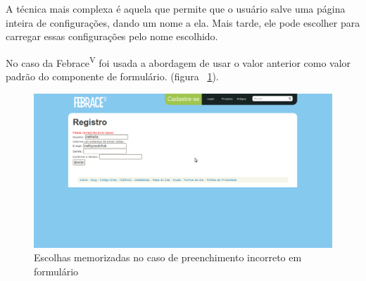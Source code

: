 A técnica mais complexa é aquela que permite que o usuário salve uma página inteira de configurações, dando um nome a ela. Mais tarde, ele pode escolher para carregar essas configurações pelo nome escolhido.

No caso da Febrace\textsuperscript{V} foi usada a abordagem de usar o valor anterior como valor padrão do componente de formulário. (figura ~\ref{remembered_choices}).

    \begin{figure}[h]
        \begin{center}
    \includegraphics[width=0.7\linewidth]{arquivos/remembered_choices.png}
        \end{center}
        \caption{Escolhas memorizadas no caso de preenchimento incorreto em formulário}
        \label{remembered_choices}
    \end{figure}
